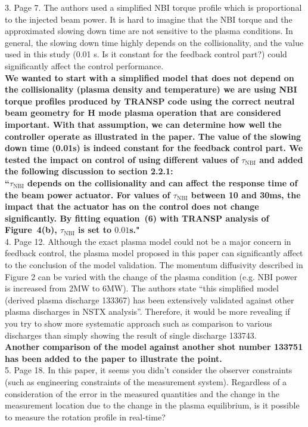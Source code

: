 \documentclass{scrartcl}
\newcommand{\response}[1]{\textcolor{red!80!black}{\bf #1}}
\begin{document}
3. Page 7. The authors used a simplified NBI torque profile which is proportional to the injected beam power. It is hard to imagine that the NBI torque and the approximated slowing down time are not sensitive to the plasma conditions. In general, the slowing down time highly depends on the collisionality, and the value used in this study (0.01 s. Is it constant for the feedback control part?) could significantly affect the control performance. \\
\response{We wanted to start with a simplified model that does not depend on the collisionality (plasma density and temperature)  we are using NBI torque profiles produced by TRANSP code using the correct neutral beam geometry for H mode plasma operation that are considered important. With that assumption, we can determine how well the controller operate as illustrated in the paper.
The value of the slowing down time (0.01s) is indeed constant for the feedback control part.
We tested the impact on control of using different values of $\tau_\text{NBI}$ and added the following discussion to section 2.2.1:\\\indent
``$\tau_\text{NBI}$ depends on the collisionality and can affect the response time of the beam power actuator.
For values of $\tau_\text{NBI}$ between 10 and 30ms, the impact that the actuator has on the control does not change significantly.
By fitting equation~(6) with TRANSP analysis of Figure~4(b),
$\tau_\text{NBI}$ is set to $0.01$s."}\\

4. Page 12. Although the exact plasma model could not be a major concern in feedback control, the plasma model proposed in this paper can significantly affect to the conclusion of the model validation. The momentum diffusivity described in Figure 2 can be varied with the change of the plasma condition (e.g. NBI power is increased from 2MW to 6MW). The authors state “this simplified model (derived plasma discharge 133367) has been extensively validated against other plasma discharges in NSTX analysis”. Therefore, it would be more revealing if you try to show more systematic approach such as comparison to various discharges than simply showing the result of single discharge 133743.\\
\response{Another comparison of the model against another shot number 133751 has been added to the paper to illustrate the point.}\\

5. Page 18. In this paper, it seems you didn’t consider the observer constraints (such as engineering constraints of the measurement system). Regardless of a consideration of the error in the measured quantities and the change in the measurement location due to the change in the plasma equilibrium, is it possible to measure the rotation profile in real-time?
\end{document}
